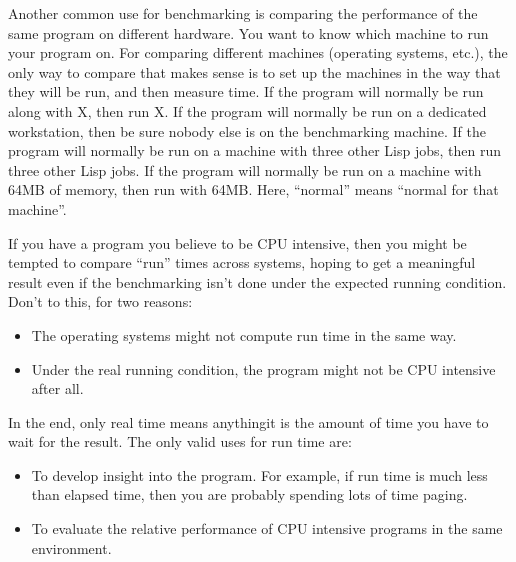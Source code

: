 Another common use for benchmarking is comparing the performance of
the same program on different hardware.  You want to know which
machine to run your program on.  For comparing different machines
(operating systems, etc.), the only way to compare that makes sense is
to set up the machines in  the way that they will
 be run, and then measure  time.  If the
program will normally be run along with X, then run X.  If the program
will normally be run on a dedicated workstation, then be sure nobody
else is on the benchmarking machine.  If the program will normally be
run on a machine with three other Lisp jobs, then run three other Lisp
jobs.  If the program will normally be run on a machine with 64MB of
memory, then run with 64MB.  Here, ``normal'' means ``normal for that
machine''.  

If you have a program you believe to be CPU intensive, then you might be
tempted to compare ``run'' times across systems, hoping to get a meaningful
result even if the benchmarking isn't done under the expected running
condition.  Don't to this, for two reasons:

\begin{itemize}  
\item The operating systems might not compute run time in the same
  way.
  
\item Under the real running condition, the program might not be CPU
  intensive after all.
\end{itemize}


In the end, only real time means anything\dash{}it is the amount of time you
have to wait for the result.  The only valid uses for run time are:

\begin{itemize}
\item To develop insight into the program.  For example, if run time
  is much less than elapsed time, then you are probably spending lots
  of time paging.
  
\item To evaluate the relative performance of CPU intensive programs
  in the same environment.
\end{itemize}
